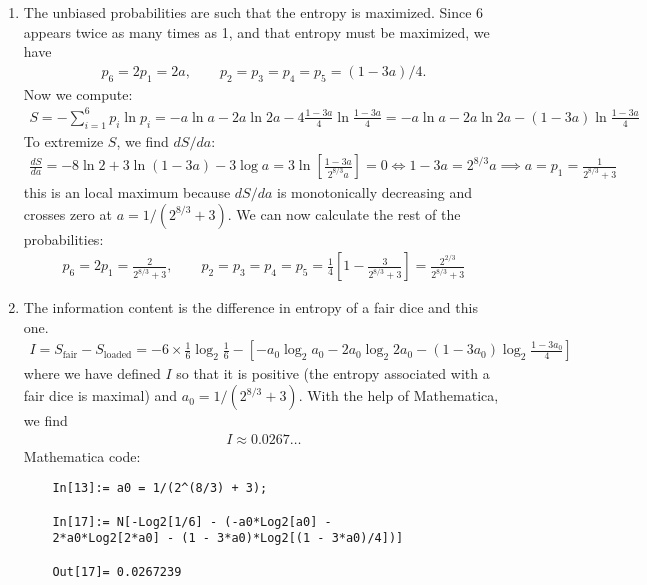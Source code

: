 \documentclass{article}
\theoremstyle{definition}
\newcommand{\f}[2]{\frac{#1}{#2}}
\newcommand{\lb}{\left[}
\newcommand{\rb}{\right]}
\begin{document}
\begin{enumerate}[label=(\alph*)]
	\item The unbiased probabilities are such that the entropy is maximized. Since 6 appears twice as many times as 1, and that entropy must be maximized, we have 
	\begin{align*}
	p_6 = 2p_1 = 2a, \quad\quad p_2 = p_3 = p_4 = p_5 = (1- 3a)/4. 
	\end{align*}
	Now we compute:
	\begin{align*}
	S = -\sum_{i=1}^6 p_i \ln p_i = -a\ln a - 2a \ln 2a - 4\f{1-3a}{4} \ln \f{1-3a}{4} = 
	-a\ln a - 2a \ln 2a - (1-3a) \ln \f{1-3a}{4}
	\end{align*}
	To extremize $S$, we find $dS/da$:
	\begin{align*}
	\f{dS}{da} = -8\ln 2 + 3\ln (1-3a) - 3\log a = 3\ln \lb \f{1-3a}{2^{8/3}a} \rb = 0 \iff 1-3a = 2^{8/3}a \implies a = p_1 = \f{1}{2^{8/3}+3}
	\end{align*}
	this is an local maximum because $dS/da$ is monotonically decreasing and crosses zero at $a = 1/(2^{8/3}+3)$.  We can now calculate the rest of the probabilities:
	\begin{align*}
	\boxed{p_6 = 2p_1 = \f{2}{2^{8/3}+3}, \quad\quad p_2 = p_3 = p_4 = p_5 = \f{1}{4}\lb 1-\f{3}{2^{8/3}+3} \rb = \f{2^{2/3} }{2^{8/3}+3} }
	\end{align*}
	
	\item The information content is the difference in entropy of a fair dice and this one. 
	\begin{align*}
	I = S_\text{fair} - S_\text{loaded}= - 6\times \f{1}{6}\log_2 \f{1}{6} - \lb -a_0\log_2 a_0 - 2a_0 \log_2 2a_0 - (1-3a_0) \log_2 \f{1-3a_0}{4} \rb
	\end{align*}
	where we have defined $I$ so that it is positive (the entropy associated with a fair dice is maximal) and $a_0 = 1/(2^{8/3}+3)$. With the help of Mathematica, we find 
	\begin{align*}
	\boxed{I \approx 0.0267\dots}
	\end{align*}
	Mathematica code:
	\begin{lstlisting}
	In[13]:= a0 = 1/(2^(8/3) + 3);
	
	In[17]:= N[-Log2[1/6] - (-a0*Log2[a0] - 
	2*a0*Log2[2*a0] - (1 - 3*a0)*Log2[(1 - 3*a0)/4])]
	
	Out[17]= 0.0267239
	\end{lstlisting}
	
	

\end{enumerate}
\end{document}
